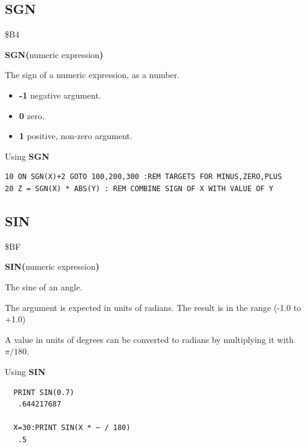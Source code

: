 \subsection{SGN}
\begin{description}[leftmargin=2cm,style=nextline]
\item [Token:] \$B4
\item [Format:] {\bf SGN(}numeric expression{\bf)}
\item [Returns:] The sign of a numeric expression, as a number.

                \begin{itemize}
                    \item {\bf -1} negative argument.
                    \item {\bf 0} zero.
                    \item {\bf 1} positive, non-zero argument.
                \end{itemize}

\item [Example:] Using {\bf SGN}
\begin{tcolorbox}[colback=black,coltext=white]
\verbatimfont{\codefont}
\begin{verbatim}
10 ON SGN(X)+2 GOTO 100,200,300 :REM TARGETS FOR MINUS,ZERO,PLUS
20 Z = SGN(X) * ABS(Y) : REM COMBINE SIGN OF X WITH VALUE OF Y
\end{verbatim}
\end{tcolorbox}
\end{description}


\newpage
\subsection{SIN}
\begin{description}[leftmargin=2cm,style=nextline]
\item [Token:] \$BF
\item [Format:] {\bf SIN(}numeric expression{\bf)}
\item [Returns:] The sine of an angle.

               The argument is expected in units of radians.
               The result is in the range (-1.0 to +1.0)

\item [Remarks:] A value in units of degrees
                 can be converted to radians
               by multiplying it with $\pi/180$.
\item [Examples:] Using {\bf SIN}
\begin{tcolorbox}[colback=black,coltext=white]
\verbatimfont{\codefont}
\begin{verbatim}
  PRINT SIN(0.7)
   .644217687

  X=30:PRINT SIN(X * ~ / 180)
   .5
\end{verbatim}
\end{tcolorbox}
\end{description}

